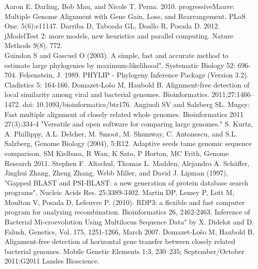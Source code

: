 \documentclass[12pt]{article}
\begin{document}
\newpage
\begin{thebibliography}{9}
Aaron E. Darling, Bob Mau, and Nicole T. Perna. 2010.  progressiveMauve: Multiple Genome Alignment with Gene Gain, Loss, and Rearrangement.  PLoS One.  5(6):e11147. 
Darriba D, Taboada GL, Doallo R, Posada D. 2012. jModelTest 2: more models, new heuristics and parallel computing. Nature Methods 9(8), 772.\\
Guindon S and Gascuel O (2003). A simple, fast and accurate method to estimate large phylogenies by maximum-likelihood". Systematic Biology 52: 696-704.
Felsenstein, J. 1989. PHYLIP - Phylogeny Inference Package (Version 3.2). Cladistics 5: 164-166. 
Domazet-Lošo M, Haubold B. Alignment-free detection of local similarity among viral and bacterial genomes. Bioinformatics. 2011;27:1466–1472. doi: 10.1093/bioinformatics/btr176.
Angiuoli SV and Salzberg SL. Mugsy: Fast multiple alignment of closely related whole genomes. Bioinformatics 2011 27(3):334-4
"Versatile and open software for comparing large genomes." S. Kurtz, A. Phillippy, A.L. Delcher, M. Smoot, M. Shumway, C. Antonescu, and S.L. Salzberg, Genome Biology (2004), 5:R12.
Adaptive seeds tame genomic sequence comparison. SM Kielbasa, R Wan, K Sato, P Horton, MC Frith, Genome Research 2011.
Stephen F. Altschul, Thomas L. Madden, Alejandro A. Schäffer, Jinghui Zhang, Zheng Zhang, Webb Miller, and David J. Lipman (1997), "Gapped BLAST and PSI-BLAST: a new generation of protein database search programs", Nucleic Acids Res. 25:3389-3402.
Martin DP, Lemey P, Lott M, Moulton V, Posada D, Lefeuvre P. (2010). RDP3: a flexible and fast computer program for analyzing recombination. Bioinformatics 26, 2462-2463.
Inference of Bacterial Mi-croevolution Using Multilocus Sequence Data" by X. Didelot and D. Falush, Genetics, Vol. 175,
1251-1266, March 2007.
Domazet-Lošo M, Haubold B. Alignment-free detection of horizontal gene transfer between closely related bacterial genomes. Mobile Genetic Elements 1:3, 230–235; September/October 2011;G2011 Landes Bioscience.
\end{thebibliography}
\end{document}
